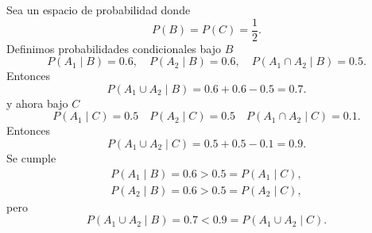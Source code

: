 \documentclass[12pt,a4paper]{article}
\begin{document}
    \begin{solucion}
        Sea un espacio de probabilidad donde
        \begin{equation*}
            P(B)=P(C)=\frac{1}{2}.
        \end{equation*}
        Definimos probabilidades condicionales bajo $B$
        \begin{equation*}
            P(A_{1}\mid B)=0.6,\quad P(A_{2}\mid B)=0.6,\quad P(A_{1}\cap A_{2}\mid B)=0.5.
        \end{equation*}
        Entonces
        \begin{equation*}
            P(A_{1}\cup A_{2}\mid B)=0.6+0.6-0.5=0.7.
        \end{equation*}
        y ahora bajo $C$
        \begin{equation*}
            P(A_{1}\mid C)=0.5\quad P(A_{2}\mid C)=0.5\quad P(A_{1}\cap A_{2}\mid C)=0.1.
        \end{equation*}
        Entonces
        \begin{equation*}
            P(A_{1}\cup A_{2}\mid C)=0.5+0.5-0.1=0.9.
        \end{equation*}
        Se cumple
        \begin{align*}
            P(A_{1}\mid B)=0.6\gt0.5=P(A_{1}\mid C),\\
            P(A_{2}\mid B)=0.6\gt0.5=P(A_{2}\mid C),
        \end{align*}
        pero
        \begin{equation*}
            P(A_{1}\cup A_{2}\mid B)=0.7\lt0.9=P(A_{1}\cup A_{2}\mid C).
        \end{equation*}
    \end{solucion}
\end{document}

